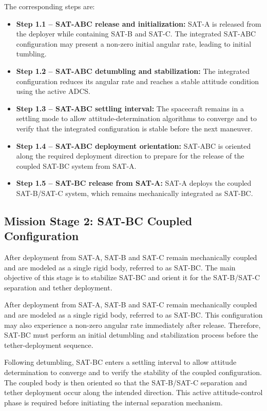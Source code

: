 The corresponding steps are:

\begin{itemize}
    \item \textbf{Step 1.1 -- SAT-ABC release and initialization:} SAT-A is released from the deployer while containing SAT-B and SAT-C. The integrated SAT-ABC configuration may present a non-zero initial angular rate, leading to initial tumbling.

    \item \textbf{Step 1.2 -- SAT-ABC detumbling and stabilization:} The integrated configuration reduces its angular rate and reaches a stable attitude condition using the active ADCS.

    \item \textbf{Step 1.3 -- SAT-ABC settling interval:} The spacecraft remains in a settling mode to allow attitude-determination algorithms to converge and to verify that the integrated configuration is stable before the next maneuver.

    \item \textbf{Step 1.4 -- SAT-ABC deployment orientation:} SAT-ABC is oriented along the required deployment direction to prepare for the release of the coupled SAT-BC system from SAT-A.

    \item \textbf{Step 1.5 -- SAT-BC release from SAT-A:} SAT-A deploys the coupled SAT-B/SAT-C system, which remains mechanically integrated as SAT-BC.
\end{itemize}

\subsection{Mission Stage 2: SAT-BC Coupled Configuration}
\label{sub:conops_stage2_satbc}

After deployment from SAT-A, SAT-B and SAT-C remain mechanically coupled and are modeled as a single rigid body, referred to as SAT-BC. The main objective of this stage is to stabilize SAT-BC and orient it for the SAT-B/SAT-C separation and tether deployment.

After deployment from SAT-A, SAT-B and SAT-C remain mechanically coupled and are modeled as a single rigid body, referred to as SAT-BC. This configuration may also experience a non-zero angular rate immediately after release. Therefore, SAT-BC must perform an initial detumbling and stabilization process before the tether-deployment sequence.

Following detumbling, SAT-BC enters a settling interval to allow attitude determination to converge and to verify the stability of the coupled configuration. The coupled body is then oriented so that the SAT-B/SAT-C separation and tether deployment occur along the intended direction. This active attitude-control phase is required before initiating the internal separation mechanism.


